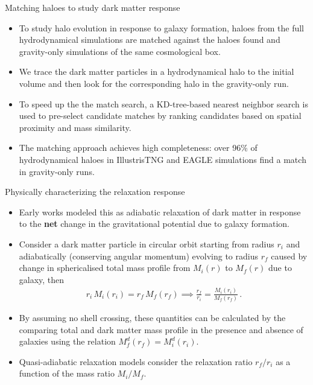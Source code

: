 \documentclass[11pt]{beamer}
\begin{document}
\begin{frame}{Matching haloes to study dark matter response}
    \begin{itemize}
        \item To study halo evolution in response to galaxy formation, haloes from the full hydrodynamical simulations are matched against the haloes found and gravity-only simulations of the same cosmological box.
        \item We trace the dark matter particles in a hydrodynamical halo to the initial volume and then look for the corresponding halo in the gravity-only run.
        \item To speed up the the match search, a KD-tree-based nearest neighbor search is used to pre-select candidate matches by ranking candidates based on spatial proximity and mass similarity.
        \item The matching approach achieves high completeness: over 96\% of hydrodynamical haloes in IllustrisTNG and EAGLE simulations find a match in gravity-only runs.
    \end{itemize}
\end{frame}

\begin{frame}{Physically characterizing the relaxation response}
\begin{itemize}
    \item Early works modeled this as adiabatic relaxation of dark matter in response to the \textbf{\color{red}net} change in the gravitational potential due to galaxy formation.
    \item Consider a dark matter particle in circular orbit starting from radius $r_i$ and adiabatically (conserving angular momentum) evolving to radius $r_f$ caused by change in sphericalised total mass profile from $M_i(r)$ to $M_f(r)$ due to galaxy, then
    \begin{align*}
        r_i \,M_i(r_i) = r_f \,M_f(r_f) %
        \implies 
        \frac{r_f}{r_i} = \frac{M_i(r_i)}{M_f(r_f)}\,. 
    \end{align*}
    \item By assuming no shell crossing, these quantities can be calculated by the comparing total and dark matter mass profile in the presence and absence of galaxies using the relation $M_f^d(r_f) = M_i^d(r_i)$.
    \item Quasi-adiabatic relaxation models consider the relaxation ratio $r_f/r_i$ as a function of the mass ratio $M_i/M_f$.
\end{itemize}
\end{frame}
\end{document}
